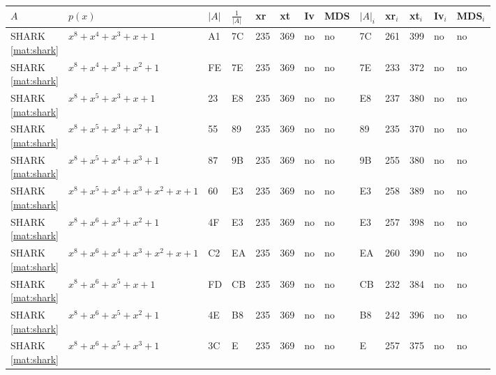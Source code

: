 \begin{tiny}
\begin{longtable}{|l|l|l|l|l|l|l|l|l|l|l|l|l|}
\hline
$A$ & $p(x)$ & $|A|$ & $\frac{1}{|A|}$ & xr & xt & Iv & MDS & $|A|_i$ & xr$_i$ & xt$_i$ & Iv$_i$ & MDS$_i$ \\ \hline
\endfirsthead
%
\endhead
%
\shortstack{SHARK \\ \eqref{mat:shark}} & $x^8 + x^4 + x^3 + x + 1$ & A1 & 7C & 235 & 369 & no & no & 7C & 261 & 399 & no & no \\ \hline
\shortstack{SHARK \\ \eqref{mat:shark}} & $x^8 + x^4 + x^3 + x^2 + 1$ & FE & 7E & 235 & 369 & no & no & 7E & 233 & 372 & no & no \\ \hline
\shortstack{SHARK \\ \eqref{mat:shark}} & $x^8 + x^5 + x^3 + x + 1$ & 23 & E8 & 235 & 369 & no & no & E8 & 237 & 380 & no & no \\ \hline
\shortstack{SHARK \\ \eqref{mat:shark}} & $x^8 + x^5 + x^3 + x^2 + 1$ & 55 & 89 & 235 & 369 & no & no & 89 & 235 & 370 & no & no \\ \hline
\shortstack{SHARK \\ \eqref{mat:shark}} & $x^8 + x^5 + x^4 + x^3 + 1$ & 87 & 9B & 235 & 369 & no & no & 9B & 255 & 380 & no & no \\ \hline
\shortstack{SHARK \\ \eqref{mat:shark}} & $x^8 + x^5 + x^4 + x^3 + x^2 + x + 1$ & 60 & E3 & 235 & 369 & no & no & E3 & 258 & 389 & no & no \\ \hline
\shortstack{SHARK \\ \eqref{mat:shark}} & $x^8 + x^6 + x^3 + x^2 + 1$ & 4F & E3 & 235 & 369 & no & no & E3 & 257 & 398 & no & no \\ \hline
\shortstack{SHARK \\ \eqref{mat:shark}} & $x^8 + x^6 + x^4 + x^3 + x^2 + x + 1$ & C2 & EA & 235 & 369 & no & no & EA & 260 & 390 & no & no \\ \hline
\shortstack{SHARK \\ \eqref{mat:shark}} & $x^8 + x^6 + x^5 + x + 1$ & FD & CB & 235 & 369 & no & no & CB & 232 & 384 & no & no \\ \hline
\shortstack{SHARK \\ \eqref{mat:shark}} & $x^8 + x^6 + x^5 + x^2 + 1$ & 4E & B8 & 235 & 369 & no & no & B8 & 242 & 396 & no & no \\ \hline
\shortstack{SHARK \\ \eqref{mat:shark}} & $x^8 + x^6 + x^5 + x^3 + 1$ & 3C & E & 235 & 369 & no & no & E & 257 & 375 & no & no \\ \hline

\end{longtable}
\end{tiny}
